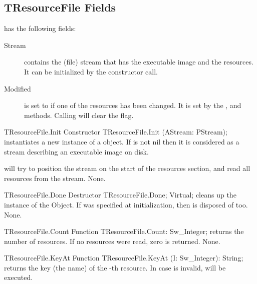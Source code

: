 \subsection{TResourceFile Fields}

 has the following fields:
\begin{description}
\item[Stream] contains the (file) stream that has the executable image and
the resources. It can be initialized by the 
constructor call.
\item[Modified] is set to  if one of the resources has been changed.
It is set by the ,
 and 
methods. Calling  will clear the
 flag.
\end{description}

\begin{procedure}{TResourceFile.Init}
\Declaration
Constructor TResourceFile.Init (AStream: PStream);
\Description
{} instantiates a new instance of a  object.
If  is not nil then it is considered as a stream describing an
executable image on disk. 

 will try to position the stream on the start of the resources section,
and read all resources from the stream.
\Errors
None.
\SeeAlso
{}
\end{procedure}

\begin{procedure}{TResourceFile.Done}
\Declaration
Destructor TResourceFile.Done; Virtual;
\Description
{} cleans up the instance of the  Object. 
If  was specified at initialization, then  is 
disposed of too.
\Errors
None.
\SeeAlso
{}
\end{procedure}

\begin{function}{TResourceFile.Count}
\Declaration
Function TResourceFile.Count: Sw\_Integer;
\Description
{} returns the number of resources. If no resources were
read, zero is returned.
\Errors
None.
\SeeAlso
{}
\end{function}

\begin{function}{TResourceFile.KeyAt}
\Declaration
Function TResourceFile.KeyAt (I: Sw\_Integer): String;
\Description
{} returns the key (the name) of the -th resource.
\Errors
In case  is invalid,  will be executed.
\SeeAlso
{}
\end{function}

